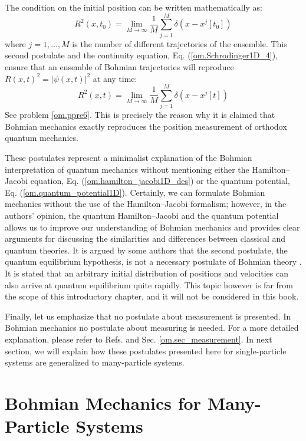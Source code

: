 \documentclass[onecolumn,nofootinbib, secnumarabic, amsmath, nobibnotes,11pt,aps,pra]{revtex4-1}
\newcommand{\sref}[1]{Sec. \ref{#1}}
\newcommand{\eref}[1]{Eq. (\ref{#1})}
\begin{document}
The condition on the initial position can be written mathematically as:
\begin{equation}
\label{om.sum_0f_particles_to}
R^2(x,t_0) = \lim_{M\rightarrow\infty} \frac {1} {M} \sum_{j = 1}^{M} \delta(x-x^j[t_0])
\end{equation}
where $j = 1,\ldots,M$ is the number of different trajectories of the
ensemble. This second postulate and the continuity equation,
\eref{om.Schrodinger1D_4}, ensure that an ensemble of Bohmian
trajectories will reproduce $R(x,t)^2 = |\psi(x,t)|^2$ at any time:
\begin{equation}
R^2(x,t) = \lim_{M\rightarrow\infty} \frac {1} {M} \sum_{j = 1}^{M} \delta(x-x^j[t])
\end{equation}
See problem \ref{om.ppre6}.
This is precisely the reason why it is claimed that Bohmian mechanics exactly reproduces the position measurement of orthodox quantum mechanics.

These postulates represent a minimalist explanation of the Bohmian
interpretation of quantum mechanics without mentioning either the Hamilton--Jacobi
equation, \eref{om.hamilton_jacobi1D_des} or the quantum potential,
\eref{om.quantum_potential1D}. Certainly, we can formulate Bohmian
mechanics without the use of the Hamilton--Jacobi formalism;
however, in the authors' opinion, the quantum Hamilton--Jacobi and
the quantum potential allows us to improve our understanding of
Bohmian mechanics and provides clear arguments for discussing the
similarities and differences between classical and quantum theories.
It is argued by some authors that the second postulate, the quantum
equilibrium hypothesis, is not a necessary postulate of Bohmian
theory \cite{om.Valentini2006,om.valentini2008}. It is stated that an
arbitrary initial distribution of positions and velocities can also
arrive at quantum equilibrium quite rapidly. This topic however is
far from the scope of this introductory chapter, and it will not be
considered in this book.

Finally, let us emphasize that no postulate about measurement is
presented. In Bohmian mechanics no postulate about measuring is
needed. For a more detailed explanation, please refer to Refs.
\cite{om.Holand1993,om.Valentini2006,om.appraisal,om.Durrllibre} and
\sref{om.sec_measurement}. In next section, we will explain how
these postulates presented here for single-particle systems are
generalized to many-particle systems.

\section{Bohmian Mechanics for Many-Particle Systems}\label{om.sec_many}
\end{document}
